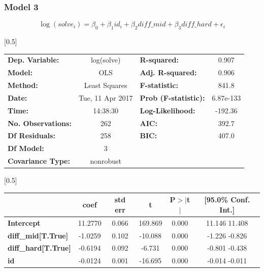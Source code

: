 \documentclass{beamer}
\begin{document}
\begin{frame}

\frametitle{Model 3}

$$
\log(solve_i) = \beta_0 + \beta_1 id_i + \beta_2 diff\_mid + \beta_3 diff\_hard + \epsilon_i
$$

\begin{center}
\scalebox{0.5}[0.5]{
\begin{tabular}{lclc}
\toprule
\textbf{Dep. Variable:}    &    log(solve)    & \textbf{  R-squared:         } &     0.907  \\
\textbf{Model:}            &       OLS        & \textbf{  Adj. R-squared:    } &     0.906  \\
\textbf{Method:}           &  Least Squares   & \textbf{  F-statistic:       } &     841.8  \\
\textbf{Date:}             & Tue, 11 Apr 2017 & \textbf{  Prob (F-statistic):} & 6.87e-133  \\
\textbf{Time:}             &     14:38:30     & \textbf{  Log-Likelihood:    } &   -192.36  \\
\textbf{No. Observations:} &         262      & \textbf{  AIC:               } &     392.7  \\
\textbf{Df Residuals:}     &         258      & \textbf{  BIC:               } &     407.0  \\
\textbf{Df Model:}         &           3      & \textbf{                     } &            \\
\textbf{Covariance Type:}  &    nonrobust     & \textbf{                     } &            \\
\bottomrule
\end{tabular}
}
\scalebox{0.5}[0.5]{
\begin{tabular}{lccccc}
\toprule
                           & \textbf{coef} & \textbf{std err} & \textbf{t} & \textbf{P$>$$|$t$|$} & \textbf{[95.0\% Conf. Int.]}  \\
\midrule
\textbf{Intercept}         &      11.2770  &        0.066     &   169.869  &         0.000        &        11.146    11.408       \\
\textbf{diff\_mid[T.True]}  &      -1.0259  &        0.102     &   -10.088  &         0.000        &        -1.226    -0.826       \\
\textbf{diff\_hard[T.True]} &      -0.6194  &        0.092     &    -6.731  &         0.000        &        -0.801    -0.438       \\
\textbf{id}                &      -0.0124  &        0.001     &   -16.695  &         0.000        &        -0.014    -0.011       \\

\end{tabular}}
\end{center}
\end{frame}
\end{document}
